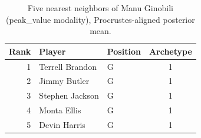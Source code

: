 \begin{table}[htbp]
  \centering\small
  \begin{tabular}{rllc}
    \toprule
    Rank & Player & Position & Archetype \\
    \midrule
    1 & Terrell Brandon & G & 1 \\
    2 & Jimmy Butler & G & 1 \\
    3 & Stephen Jackson & G & 1 \\
    4 & Monta Ellis & G & 1 \\
    5 & Devin Harris & G & 1 \\
    \bottomrule
  \end{tabular}
  \caption{Five nearest neighbors of Manu Ginobili (peak_value modality), Procrustes-aligned posterior mean.}
  \label{tab:Manu_Ginobili_neighbors_peak_value}
\end{table}

